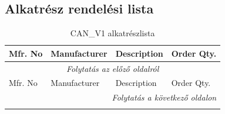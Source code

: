 \begin{landscape}
	\section{Alkatrész rendelési lista}
	\begin{center}
		\begin{longtable}{@{} p{6cm} p{5cm} p{10cm} p{2cm} @{}}
			\caption{CAN\_V1 alkatrészlista}\\
			\toprule
			Mfr. No & Manufacturer & Description & Order Qty. \\
			\midrule
			\endfirsthead
			
			\multicolumn{4}{c}{\textit{Folytatás az előző oldalról}}\\
			\toprule
			Mfr. No & Manufacturer & Description & Order Qty. \\
			\midrule
			\endhead
			
			\midrule
			\multicolumn{4}{r}{\textit{Folytatás a következő oldalon}}\\
			\endfoot
			
			\bottomrule
			\endlastfoot
			

\end{longtable}
\end{center}
\end{landscape}
